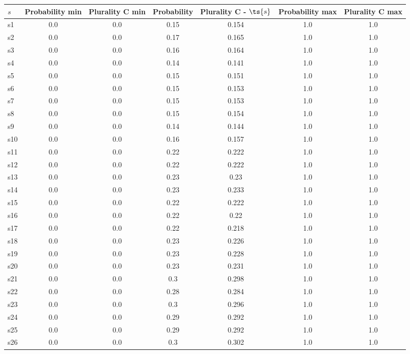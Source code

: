 \documentclass{article}
\begin{document}
\noindent\begin{tabular}{|l|c|c|c|c|c|c|}
\hline
$s$& Probability min & Plurality C min & Probability & Plurality C - $\ts{s}$ & Probability max & Plurality C max\\
\hline
s1 &0.0 & 0.0 & 0.15 & 0.154 & 1.0 & 1.0\\
\hline
s2 &0.0 & 0.0 & 0.17 & 0.165 & 1.0 & 1.0\\
\hline
s3 &0.0 & 0.0 & 0.16 & 0.164 & 1.0 & 1.0\\
\hline
s4 &0.0 & 0.0 & 0.14 & 0.141 & 1.0 & 1.0\\
\hline
s5 &0.0 & 0.0 & 0.15 & 0.151 & 1.0 & 1.0\\
\hline
s6 &0.0 & 0.0 & 0.15 & 0.153 & 1.0 & 1.0\\
\hline
s7 &0.0 & 0.0 & 0.15 & 0.153 & 1.0 & 1.0\\
\hline
s8 &0.0 & 0.0 & 0.15 & 0.154 & 1.0 & 1.0\\
\hline
s9 &0.0 & 0.0 & 0.14 & 0.144 & 1.0 & 1.0\\
\hline
s10 &0.0 & 0.0 & 0.16 & 0.157 & 1.0 & 1.0\\
\hline
s11 &0.0 & 0.0 & 0.22 & 0.222 & 1.0 & 1.0\\
\hline
s12 &0.0 & 0.0 & 0.22 & 0.222 & 1.0 & 1.0\\
\hline
s13 &0.0 & 0.0 & 0.23 & 0.23 & 1.0 & 1.0\\
\hline
s14 &0.0 & 0.0 & 0.23 & 0.233 & 1.0 & 1.0\\
\hline
s15 &0.0 & 0.0 & 0.22 & 0.222 & 1.0 & 1.0\\
\hline
s16 &0.0 & 0.0 & 0.22 & 0.22 & 1.0 & 1.0\\
\hline
s17 &0.0 & 0.0 & 0.22 & 0.218 & 1.0 & 1.0\\
\hline
s18 &0.0 & 0.0 & 0.23 & 0.226 & 1.0 & 1.0\\
\hline
s19 &0.0 & 0.0 & 0.23 & 0.228 & 1.0 & 1.0\\
\hline
s20 &0.0 & 0.0 & 0.23 & 0.231 & 1.0 & 1.0\\
\hline
s21 &0.0 & 0.0 & 0.3 & 0.298 & 1.0 & 1.0\\
\hline
s22 &0.0 & 0.0 & 0.28 & 0.284 & 1.0 & 1.0\\
\hline
s23 &0.0 & 0.0 & 0.3 & 0.296 & 1.0 & 1.0\\
\hline
s24 &0.0 & 0.0 & 0.29 & 0.292 & 1.0 & 1.0\\
\hline
s25 &0.0 & 0.0 & 0.29 & 0.292 & 1.0 & 1.0\\
\hline
s26 &0.0 & 0.0 & 0.3 & 0.302 & 1.0 & 1.0\\
\hline

\end{tabular}
\end{document}
